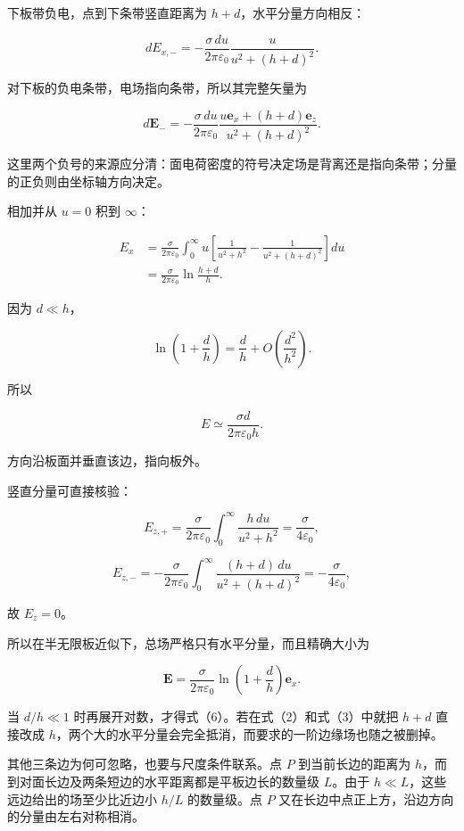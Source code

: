 \documentclass[12pt,a4paper,UTF8]{ctexart}
\begin{document}
下板带负电，点到下条带竖直距离为 \(h+d\)，水平分量方向相反：

\[
dE_{x,-}
=-\frac{\sigma\,du}{2\pi\varepsilon_0}
\frac{u}{u^2+(h+d)^2}.
\tag{3}
\]

对下板的负电条带，电场指向条带，所以其完整矢量为

\[
d\boldsymbol E_-
=-\frac{\sigma\,du}{2\pi\varepsilon_0}
\frac{u\boldsymbol e_x+(h+d)\boldsymbol e_z}
{u^2+(h+d)^2}.
\]

这里两个负号的来源应分清：面电荷密度的符号决定场是背离还是指向条带；分量的正负则由坐标轴方向决定。

相加并从 \(u=0\) 积到 \(\infty\)：

\[
\begin{aligned}
E_x
&=\frac{\sigma}{2\pi\varepsilon_0}
\int_0^\infty
u\left[
\frac1{u^2+h^2}
-\frac1{u^2+(h+d)^2}
\right]du\\
&=\frac{\sigma}{2\pi\varepsilon_0}
\ln\frac{h+d}{h}.
\end{aligned}
\tag{4}
\]

因为 \(d\ll h\)，

\[
\ln\left(1+\frac dh\right)
=\frac dh+O\!\left(\frac{d^2}{h^2}\right).
\tag{5}
\]

所以

\[
\boxed{
E\simeq\frac{\sigma d}{2\pi\varepsilon_0h}
}.
\tag{6}
\]

方向沿板面并垂直该边，指向板外。

竖直分量可直接核验：

\[
E_{z,+}
=\frac{\sigma}{2\pi\varepsilon_0}
\int_0^\infty\frac{h\,du}{u^2+h^2}
=\frac{\sigma}{4\varepsilon_0},
\tag{7}
\]

\[
E_{z,-}
=-\frac{\sigma}{2\pi\varepsilon_0}
\int_0^\infty\frac{(h+d)\,du}{u^2+(h+d)^2}
=-\frac{\sigma}{4\varepsilon_0},
\tag{8}
\]

故 \(E_z=0\)。

所以在半无限板近似下，总场严格只有水平分量，而且精确大小为

\[
\boxed{
\boldsymbol E
=\frac{\sigma}{2\pi\varepsilon_0}
\ln\left(1+\frac dh\right)\boldsymbol e_x
}.
\]

当 \(d/h\ll1\) 时再展开对数，才得式（6）。若在式（2）和式（3）中就把
\(h+d\) 直接改成
\(h\)，两个大的水平分量会完全抵消，而要求的一阶边缘场也随之被删掉。

其他三条边为何可忽略，也要与尺度条件联系。点 \(P\) 到当前长边的距离为
\(h\)，而到对面长边及两条短边的水平距离都是平板边长的数量级 \(L\)。由于
\(h\ll L\)，这些远边给出的场至少比近边小 \(h/L\) 的数量级。点 \(P\)
又在长边中点正上方，沿边方向的分量由左右对称相消。
\end{document}
